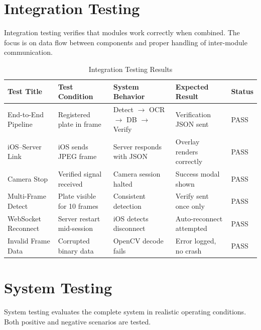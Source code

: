 \section{Integration Testing}
Integration testing verifies that modules work correctly when combined. The focus is on data flow between components and proper handling of inter-module communication.

\begin{table}[H]
\centering
\renewcommand{\arraystretch}{1.4}
\setlength{\tabcolsep}{3pt}
\footnotesize
\begin{tabular}{| m{2.3cm} | m{3.2cm} | m{3.5cm} | m{3.2cm} | m{1.2cm} |}
\hline
\textbf{Test Title} & \textbf{Test Condition} & \textbf{System Behavior} & \textbf{Expected Result} & \textbf{Status} \\
\hline
End-to-End Pipeline & Registered plate in frame & Detect $\to$ OCR $\to$ DB $\to$ Verify & Verification JSON sent & PASS \\
\hline
iOS--Server Link & iOS sends JPEG frame & Server responds with JSON & Overlay renders correctly & PASS \\
\hline
Camera Stop & Verified signal received & Camera session halted & Success modal shown & PASS \\
\hline
Multi-Frame Detect & Plate visible for 10 frames & Consistent detection & Verify sent once only & PASS \\
\hline
WebSocket Reconnect & Server restart mid-session & iOS detects disconnect & Auto-reconnect attempted & PASS \\
\hline
Invalid Frame Data & Corrupted binary data & OpenCV decode fails & Error logged, no crash & PASS \\
\hline
\end{tabular}
\caption{Integration Testing Results}
\end{table}

\section{System Testing}
System testing evaluates the complete system in realistic operating conditions. Both positive and negative scenarios are tested.

